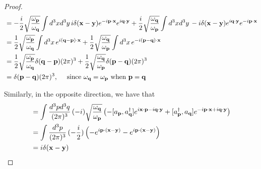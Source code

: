 \begin{thm}
\begin{proof}
\begin{align*}
&= - \frac{ i }{2}  \sqrt{ \frac{ \omega_\mathbf{ p}}{ \omega_\mathbf{ q} } } \int d^ 3 x d^3 y\,  i \delta ( \mathbf{  x - y } ) e^{ - i \mathbf{ p } \cdot \mathbf{x} } e^{  i \mathbf{q} \cdot \mathbf{y } }  + \frac{ i }{ 2} \sqrt { \frac{ \omega_\mathbf{ q} } { \omega_\mathbf{ p}}} \int d^ 3 x d^ 3 y\,   - i \delta ( \mathbf{  x -y  } ) e^{ i \mathbf{q} \cdot \mathbf{y } } e^{ - i \mathbf{ p  } \cdot \mathbf{x} } \\
& = \frac{ 1} { 2} \sqrt { \frac{ \omega_\mathbf{  p } } { \omega_\mathbf{ q}}} \int d^3 x\,  e^{ i \mathbf{  (q-p) } \cdot \mathbf{x} } + \frac{ 1} {2} \sqrt { \frac{ \omega_\mathbf{ q}}{ \omega_\mathbf{ p}}} \int d^3 x \, e^{ - i \mathbf{ (p-q)   } \cdot \mathbf{x} } \\
&= \frac{ 1}{ 2} \sqrt{ \frac{ \omega_\mathbf{ p}} { \omega_\mathbf{ q}}} \delta( \mathbf{  q - p   } ) ( 2 \pi ) ^3  + \frac{ 1}{ 2} \sqrt{ \frac{ \omega_\mathbf{ q} } { \omega_\mathbf{ p }}} \delta ( \mathbf{  p - q  } ) ( 2 \pi ) ^  3 \\
& = \delta ( \mathbf{  p - q  } ) ( 2 \pi )^ 3, \quad \text{ since } \omega_\mathbf{ q} = \omega_\mathbf{  p} \text { when } \mathbf{ p }  = \mathbf{  q  } 
\end{align*} 

Similarly, in the opposite direction, we have that 
\begin{align*} 
[ \scal{x}, \mom{y} ] &= \int \frac{ d^ 3 p d^3 q } { ( 2\pi) ^ 3 } \, ( -i ) \sqrt{ \frac{ \freq{ q } } { \freq{ p } } } \left( - [ \ann{p}, \crea{ q} ] e^{ i \mathbf{ x} \cdot \mathbf{p}  - i \mathbf{ q} \cdot \mathbf{ y } } + [ \crea{ p } , \ann{ q} ] e^{  - i \mathbf{ p } \cdot \mathbf{ x } + i \mathbf{ q} \cdot \mathbf{ y}} \right) \\
& = \intp (  - \frac{ i } { 2} ) \left(  - e^{ i \mathbf{p } \cdot ( \ve{ x - y} ) } - e^{ i \mathbf{ p } \cdot ( \ve{ x -y}  )   } \right) \\
&= i \delta ( \ve{x - y } )  
\end{align*} 
\end{proof} 
\end{thm} 

